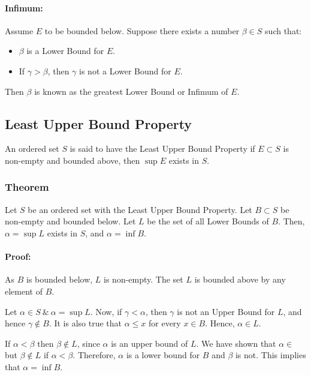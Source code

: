 \documentclass[12pt, oneside]{book}
\begin{document}
\paragraph{Infimum:} Assume \(E\) to be bounded below.
Suppose there exists a number \(\beta \in S\) such that:
\begin{itemize}
	\item \(\beta\) is a Lower Bound for \(E\).
	\item If \(\gamma > \beta\), then \(\gamma\) is not a Lower Bound for \(E\).
\end{itemize}
Then \( \beta \) is known as the greatest Lower Bound or Infimum of \(E\).

\subsection{Least Upper Bound Property}
An ordered set \(S\) is said to have the Least Upper Bound Property if \(E \subset S\) is non-empty and bounded above, then \( \sup E\) exists in \(S\).

\subsubsection{Theorem}
Let \(S\) be an ordered set with the Least Upper Bound Property.
Let \(B \subset S\) be non-empty and bounded below.
Let \(L\) be the set of all Lower Bounds of \(B\).
Then, \( \alpha = \sup L \) exists in \(S\), and \(\alpha = \inf B\).

\paragraph{Proof:} As \(B\) is bounded below, \(L\) is non-empty.
The set \(L\) is bounded above by any element of \(B\).

Let \( \alpha \in S \: \& \: \alpha = \sup L \).
Now, if \( \gamma < \alpha \), then \(\gamma\) is not an Upper Bound for \(L\), and hence \( \gamma \notin B \).
It is also true that \( \alpha \leq x \) for every \( x \in B \).
Hence, \( \alpha \in L \).

If \( \alpha < \beta \) then \( \beta \notin L \), since \( \alpha \) is an upper bound of \(L\).
We have shown that \( \alpha \in \) but \(\beta \notin L\) if \( \alpha < \beta \).
Therefore, \( \alpha \) is a lower bound for \(B\) and \(\beta\) is not.
This implies that \( \alpha = \inf B \).
\end{document}
